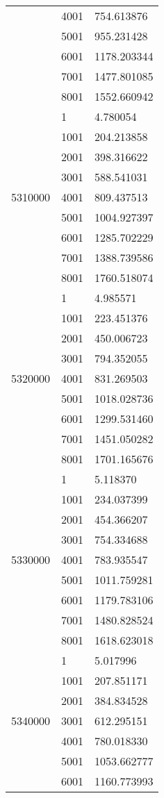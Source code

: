 \begin{table}[htb!]
\begin{tabular}{lll}
 & 4001 & 754.613876 \\
 & 5001 & 955.231428 \\
 & 6001 & 1178.203344 \\
 & 7001 & 1477.801085 \\
 & 8001 & 1552.660942 \\
\multirow[c]{9}{*}{5310000} & 1 & 4.780054 \\
 & 1001 & 204.213858 \\
 & 2001 & 398.316622 \\
 & 3001 & 588.541031 \\
 & 4001 & 809.437513 \\
 & 5001 & 1004.927397 \\
 & 6001 & 1285.702229 \\
 & 7001 & 1388.739586 \\
 & 8001 & 1760.518074 \\
\multirow[c]{9}{*}{5320000} & 1 & 4.985571 \\
 & 1001 & 223.451376 \\
 & 2001 & 450.006723 \\
 & 3001 & 794.352055 \\
 & 4001 & 831.269503 \\
 & 5001 & 1018.028736 \\
 & 6001 & 1299.531460 \\
 & 7001 & 1451.050282 \\
 & 8001 & 1701.165676 \\
\multirow[c]{9}{*}{5330000} & 1 & 5.118370 \\
 & 1001 & 234.037399 \\
 & 2001 & 454.366207 \\
 & 3001 & 754.334688 \\
 & 4001 & 783.935547 \\
 & 5001 & 1011.759281 \\
 & 6001 & 1179.783106 \\
 & 7001 & 1480.828524 \\
 & 8001 & 1618.623018 \\
\multirow[c]{9}{*}{5340000} & 1 & 5.017996 \\
 & 1001 & 207.851171 \\
 & 2001 & 384.834528 \\
 & 3001 & 612.295151 \\
 & 4001 & 780.018330 \\
 & 5001 & 1053.662777 \\
 & 6001 & 1160.773993 \\

\end{tabular}
\end{table}
